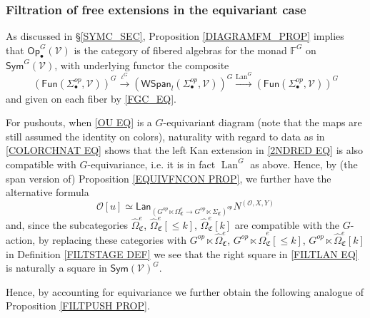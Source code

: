 \documentclass[a4paper,10pt
,draft
]{article}%
\numberwithin{equation}{section}
\numberwithin{figure}{section}
\theoremstyle{definition} %
\newcommand{\Sym}{\ensuremath{\mathsf{Sym}}}%
\newcommand{\Op}{\mathsf{Op}}%
\newcommand{\Fun}{\mathsf{Fun}}
\DeclareMathOperator{\Lan}{Lan}%
\newcommand{\V}{\ensuremath{\mathcal V}}
\renewcommand{\O}{\ensuremath{\mathcal O}}
\newcommand{\1}{\ensuremath{\mathbbm 1}}%
\begin{document}
\subsubsection{Filtration of free extensions in the equivariant case}

As discussed in \S \ref{SYMC_SEC},
Proposition \ref{DIAGRAMFM_PROP} implies that $\Op^G_\bullet(\V)$ is the category of fibered algebras for the monad $\mathbb F^G$ on $\Sym^G(\V)$,
with underlying functor the composite
\[
      \left(
            \Fun(\Sigma^{op}_{\bullet}, \mathcal V)
      \right)^G
      \xrightarrow{\iota^G}
      \left(
            \mathsf{WSpan}_l
            (\Sigma^{op}_{\bullet},\mathcal{V})
      \right)^G
      \xrightarrow{\Lan^G}
      \left(
            \mathsf{Fun}
            (\Sigma^{op}_{\bullet},\mathcal{V})
      \right)^G
\]
and given on each fiber by \eqref{FGC_EQ}.
      
For pushouts, when \eqref{OU EQ} is a $G$-equivariant diagram (note that the maps are still assumed the identity on colors),
naturality with regard to data as in \eqref{COLORCHNAT EQ}
shows that the left Kan extension in 
\eqref{2NDRED EQ} 
is also compatible with $G$-equivariance, i.e. it is in fact $\Lan^G$ as above.
Hence, by (the span version of) Proposition \ref{EQUIVFNCON PROP},
we further have the alternative formula
\begin{equation}\label{3RDRED EQ}
\O[u] \simeq
	\mathsf{Lan}_{\left(G^{op} \ltimes \Omega_{\mathfrak C}^{e} \to
	G^{op} \ltimes \Sigma_{\mathfrak C}\right)^{op}} N^{(\O,X,Y)}
\end{equation}
and, since the subcategories 
$\widehat{\Omega}_{\mathfrak{C}}^e$,
$\widehat{\Omega}_{\mathfrak{C}}^e[\leq k]$,
$\widehat{\Omega}_{\mathfrak{C}}^e[k]$
are compatible with the $G$-action, by replacing these categories with 
$G^{op} \ltimes \widehat{\Omega}_{\mathfrak{C}}^e$,
$G^{op} \ltimes \widehat{\Omega}_{\mathfrak{C}}^e[\leq k]$,
$G^{op} \ltimes \widehat{\Omega}_{\mathfrak{C}}^e[k]$
in Definition \ref{FILTSTAGE DEF}
we see that the right square in \eqref{FILTLAN EQ}
is naturally a square in 
$\mathsf{Sym}(\mathcal{V})^G$.

Hence, by accounting for equivariance
we further obtain the following analogue of 
Proposition \ref{FILTPUSH PROP}.
\end{document}
